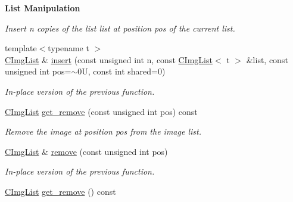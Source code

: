 \begin{Indent}{\bf List Manipulation}
\begin{DoxyCompactItemize}
\begin{DoxyCompactList}\small\item\em Insert n copies of the list {\ttfamily list} at position {\ttfamily pos} of the current list. \end{DoxyCompactList}\item 
\hypertarget{structcimg__library_1_1_c_img_list_a60b8df5890f4435939af54a6fd99458e}{{\footnotesize template$<$typename t $>$ }\\\hyperlink{structcimg__library_1_1_c_img_list}{C\-Img\-List} \& \hyperlink{structcimg__library_1_1_c_img_list_a60b8df5890f4435939af54a6fd99458e}{insert} (const unsigned int n, const \hyperlink{structcimg__library_1_1_c_img_list}{C\-Img\-List}$<$ t $>$ \&list, const unsigned int pos=$\sim$0\-U, const int shared=0)}\label{structcimg__library_1_1_c_img_list_a60b8df5890f4435939af54a6fd99458e}

\begin{DoxyCompactList}\small\item\em In-\/place version of the previous function. \end{DoxyCompactList}\item 
\hypertarget{structcimg__library_1_1_c_img_list_afff4b865fa0601ec7f7dfffccaae1238}{\hyperlink{structcimg__library_1_1_c_img_list}{C\-Img\-List} \hyperlink{structcimg__library_1_1_c_img_list_afff4b865fa0601ec7f7dfffccaae1238}{get\-\_\-remove} (const unsigned int pos) const }\label{structcimg__library_1_1_c_img_list_afff4b865fa0601ec7f7dfffccaae1238}

\begin{DoxyCompactList}\small\item\em Remove the image at position {\ttfamily pos} from the image list. \end{DoxyCompactList}\item 
\hypertarget{structcimg__library_1_1_c_img_list_a62889566e5960a79df5bc2d7c9a497df}{\hyperlink{structcimg__library_1_1_c_img_list}{C\-Img\-List} \& \hyperlink{structcimg__library_1_1_c_img_list_a62889566e5960a79df5bc2d7c9a497df}{remove} (const unsigned int pos)}\label{structcimg__library_1_1_c_img_list_a62889566e5960a79df5bc2d7c9a497df}

\begin{DoxyCompactList}\small\item\em In-\/place version of the previous function. \end{DoxyCompactList}\item 
\hypertarget{structcimg__library_1_1_c_img_list_acbdb21fd2e852466e2121634ba4d737b}{\hyperlink{structcimg__library_1_1_c_img_list}{C\-Img\-List} \hyperlink{structcimg__library_1_1_c_img_list_acbdb21fd2e852466e2121634ba4d737b}{get\-\_\-remove} () const }\label{structcimg__library_1_1_c_img_list_acbdb21fd2e852466e2121634ba4d737b}


\end{DoxyCompactItemize}
\end{Indent}
